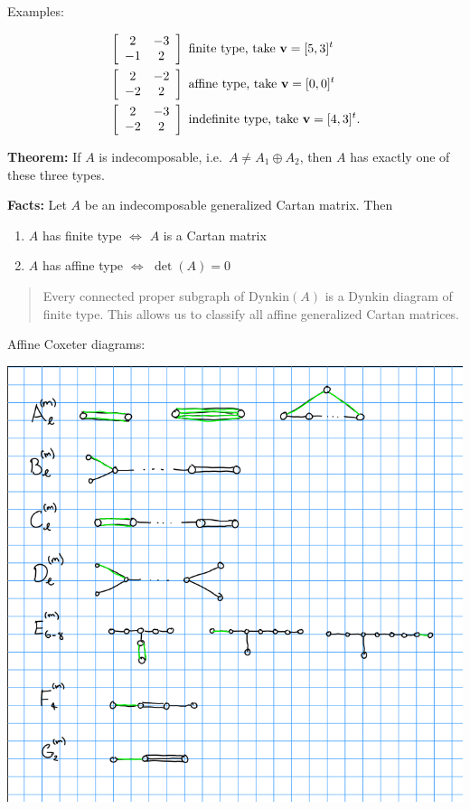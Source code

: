 Examples:

\begin{align*}
&\left[\begin{array}{cc} 
2 & -3 \\ 
-1 & 2 
\end{array}\right] ~\text{finite type, take } \mathbf{v} = [5,3]^t
\quad \\
&\left[\begin{array}{cc} 
2 & -2 \\ 
-2 & 2 
\end{array}\right] ~ \text{affine type, take } \mathbf{v} = [0, 0]^t
\quad \\
&\left[\begin{array}{cc} 
2 & -3 \\ 
-2 & 2 
\end{array}\right] ~ \text{indefinite type, take } \mathbf{v} = [4, 3]^t
.\end{align*}

\textbf{Theorem:} If \(A\) is indecomposable,
i.e.~\(A \neq A_1 \oplus A_2\), then \(A\) has exactly one of these
three types.

\textbf{Facts:} Let \(A\) be an indecomposable generalized Cartan
matrix. Then

\begin{enumerate}
\def\labelenumi{\alph{enumi}.}
\tightlist
\item
  \(A\) has finite type \(\iff\) \(A\) is a Cartan matrix
\item
  \(A\) has affine type \(\iff\) \(\det(A) = 0\)
\end{enumerate}

\begin{quote}
Every connected proper subgraph of \(\mathrm{Dynkin}(A)\) is a Dynkin
diagram of finite type. This allows us to classify all affine
generalized Cartan matrices.
\end{quote}

Affine Coxeter diagrams:

\includegraphics{figures/2019-12-02-09:54.png}\\

